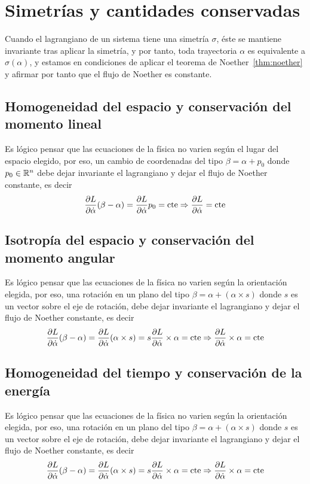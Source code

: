 \chapter{Simetrías y cantidades conservadas}
Cuando el lagrangiano de un sistema tiene una simetría $\sigma$, éste se mantiene invariante tras aplicar la simetría, y por tanto, toda trayectoria $\alpha$ es equivalente a $\sigma(\alpha)$, y estamos en condiciones de aplicar el teorema de Noether~\ref{thm:noether} y afirmar por tanto que el flujo de Noether es constante.


\section{Homogeneidad del espacio y conservación del momento lineal}
Es lógico pensar que las ecuaciones de la física no varien según el lugar del espacio elegido, por eso, un cambio de coordenadas del tipo $\beta=\alpha+p_0$ donde $p_0\in\mathbb{R}^n$ debe dejar invariante el lagrangiano y dejar el flujo de Noether constante, es decir
\begin{equation}
    \label{eq:conservacion_momento_lineal}
    \frac{\partial L}{\partial\dot{\alpha}}(\beta-\alpha) = \frac{\partial L}{\partial\dot{\alpha}}p_0=\text{cte}\Rightarrow\frac{\partial L}{\partial\dot{\alpha}}=\text{cte}
\end{equation}

\section{Isotropía del espacio y conservación del momento angular}
Es lógico pensar que las ecuaciones de la física no varien según la orientación elegida, por eso, una rotación en un plano del tipo $\beta=\alpha + (\alpha\times s)$ donde $s$ es un vector sobre el eje de rotación, debe dejar invariante el lagrangiano y dejar el flujo de Noether constante, es decir
\begin{equation}
    \label{eq:conservacion_momento_angular}
    \frac{\partial L}{\partial\dot{\alpha}}(\beta-\alpha) = \frac{\partial L}{\partial\dot{\alpha}}(\alpha\times s) = s \frac{\partial L}{\partial\dot{\alpha}}\times \alpha=\text{cte}\Rightarrow\frac{\partial L}{\partial\dot{\alpha}}\times \alpha=\text{cte}
\end{equation}

\section{Homogeneidad del tiempo y conservación de la energía}
Es lógico pensar que las ecuaciones de la física no varien según la orientación elegida, por eso, una rotación en un plano del tipo $\beta=\alpha + (\alpha\times s)$ donde $s$ es un vector sobre el eje de rotación, debe dejar invariante el lagrangiano y dejar el flujo de Noether constante, es decir
\begin{equation}
    \label{eq:conservacion_momento_angular}
    \frac{\partial L}{\partial\dot{\alpha}}(\beta-\alpha) = \frac{\partial L}{\partial\dot{\alpha}}(\alpha\times s) = s \frac{\partial L}{\partial\dot{\alpha}}\times \alpha=\text{cte}\Rightarrow\frac{\partial L}{\partial\dot{\alpha}}\times \alpha=\text{cte}
\end{equation}

